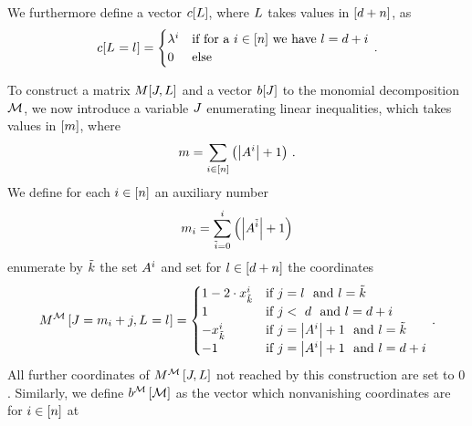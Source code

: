We furthermore define a vector $c[L]$, where $L$ takes values in $[d+n]$, as
\begin{align}\label{eq:ilpPotential}
	c[\indexedselvariable] =
	\begin{cases}
		\slicescalarof{\decindex} & \text{if for a } \decindexin \text{ we have } \selindex = \catorder + \decindex \\
		0 & \text{else} 
	\end{cases} \, . 
\end{align}

To construct a matrix $M[J,L]$ and a vector $b[J]$ to the monomial decomposition $\mathcal{M}$, we now introduce a variable $J$ enumerating linear inequalities, which takes values in $[m]$, where
	\[ m =  \sum_{i\in[n]} \left(\left|A^{i}\right| +1\right) \, . \]
We define for each $i\in[n]$ an auxiliary number
	\[ m_{i} = \sum_{\tilde{i}=0}^{i} \left(\left|A^{\tilde{i}}\right| +1\right) \]
enumerate by $\tilde{k}$ the set $A^{i}$ and set for $l\in[d+n]$ the coordinates 
\begin{align}\label{eq:ilpMatrix}
	\matrixofat{\sliceset}{\datvariable=\datanum_{\decindex}+\datindex,\indexedselvariable} =
	\begin{cases}
		1 - 2 \cdot  \catindexof{\seccatenumerator}^{\decindex} & \text{if }  \datindex = \selindex  \text{ and } \selindex = \seccatenumerator   \\ %
		1 & \text{if } \datindex < \catorder  \text{ and } \selindex=\catorder+\decindex \\ %
		-\catindexof{\seccatenumerator}^{\decindex} & \text{if }  \datindex = \cardof{\variablesetof{\decindex}} + 1   \text{ and }  \selindex=\seccatenumerator  \\ %
		-1 & \text{if }  \datindex = \cardof{\variablesetof{\decindex}} + 1  \text{ and }  \selindex = \catorder + \decindex \\ %
	\end{cases} \, . 
\end{align}
All further coordinates of $M^{\mathcal{M}}\left[J,L\right]$ not reached by this construction are set to $0$.
Similarly, we define $b^{\mathcal{M}}\left[\mathcal{M}\right]$ as the vector which nonvanishing coordinates are for $i\in[n]$ at

